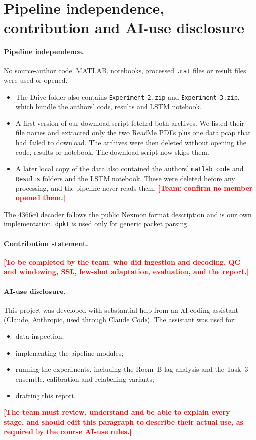 \documentclass[11pt,a4paper]{article}
\newcommand{\todo}[1]{\textcolor{red}{\textbf{[#1]}}}
\begin{document}
\section{Pipeline independence, contribution and AI-use disclosure}

\paragraph{Pipeline independence.} No source-author code, MATLAB, notebooks, processed \texttt{.mat} files or result files were used or opened.
\begin{itemize}
  \item The Drive folder also contains \texttt{Experiment-2.zip} and \texttt{Experiment-3.zip}, which bundle the authors' code, results and LSTM notebook.
  \item A first version of our download script fetched both archives. We listed their file names and extracted only the two ReadMe PDFs plus one data pcap that had failed to download. The archives were then deleted without opening the code, results or notebook. The download script now skips them.
  \item A later local copy of the data also contained the authors' \texttt{matlab code} and \texttt{Results} folders and the LSTM notebook. These were deleted before any processing, and the pipeline never reads them. \todo{Team: confirm no member opened them.}
\end{itemize}
The 4366c0 decoder follows the public Nexmon format description and is our own implementation. \texttt{dpkt} is used only for generic packet parsing.

\paragraph{Contribution statement.} \todo{To be completed by the team: who did ingestion and decoding, QC and windowing, SSL, few-shot adaptation, evaluation, and the report.}

\paragraph{AI-use disclosure.} This project was developed with substantial help from an AI coding assistant (Claude, Anthropic, used through Claude Code). The assistant was used for:
\begin{itemize}
  \item data inspection;
  \item implementing the pipeline modules;
  \item running the experiments, including the Room~B lag analysis and the Task~3 ensemble, calibration and relabelling variants;
  \item drafting this report.
\end{itemize}
\todo{The team must review, understand and be able to explain every stage, and should edit this paragraph to describe their actual use, as required by the course AI-use rules.}
\end{document}
